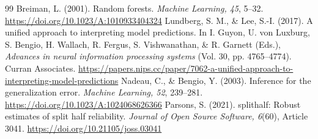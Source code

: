 \begin{thebibliography}{99}\small{}
 \color{reused} Breiman, L. (2001). Random forests. \textit{Machine Learning, 45}, 5--32. \url{https://doi.org/10.1023/A:1010933404324}
 \color{reused} Lundberg, S. M., \& Lee, S.-I. (2017). A unified approach to interpreting model predictions. In I. Guyon, U. von Luxburg, S. Bengio, H. Wallach, R. Fergus, S. Vishwanathan, \& R. Garnett (Eds.), \textit{Advances in neural information processing systems} (Vol. 30, pp. 4765--4774). Curran Associates. \url{https://papers.nips.cc/paper/7062-a-unified-approach-to-interpreting-model-predictions}
 \color{reused} Nadeau, C., \& Bengio, Y. (2003). Inference for the generalization error. \textit{Machine Learning, 52}, 239--281. \url{https://doi.org/10.1023/A:1024068626366}
 \color{reused} Parsons, S. (2021). splithalf: Robust estimates of split half reliability. \textit{Journal of Open Source Software, 6}(60), Article 3041. \url{https://doi.org/10.21105/joss.03041}
\end{thebibliography}